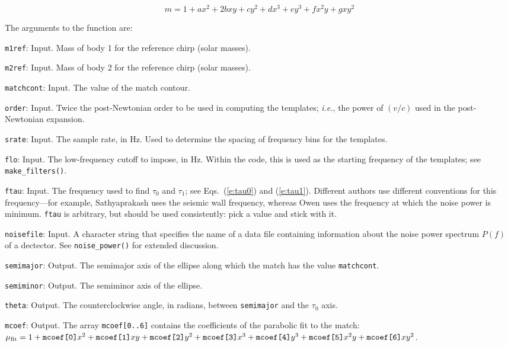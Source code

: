 \begin{equation}
m = 1 + a x^2 + 2b xy + c y^2 + dx^3 + e y^3 + fx^2y + g xy^2
\end{equation}

The arguments to the function are:

\begin{description}
\item{\tt{m1ref}}: Input.  Mass of body 1 for the reference chirp
(solar masses).
\item{\tt{m2ref}}: Input.  Mass of body 2 for the reference chirp
(solar masses).
\item{\tt{matchcont}}: Input.  The value of the match contour.
\item{\tt{order}}: Input.  Twice the post-Newtonian order to be
used in computing the templates; {\it i.e.}, the power of $(v/c)$
used in the post-Newtonian expansion.
\item{\tt{srate}}: Input.  The sample rate, in Hz.  Used to
determine the spacing of frequency bins for the templates.
\item{\tt{flo}}: Input. The low-frequency cutoff to impose, in
Hz. Within the code, this is used as the starting frequency of
the templates; see {\tt make\_filters()}.
\item{\tt{ftau}}: Input. The frequency used to find $\tau_0$
and $\tau_1$; see Eqs.\ (\ref{e:tau0}) and (\ref{e:tau1}).
Different authors use different conventions for this
frequency---for example, Sathyaprakash uses the seismic wall
frequency, whereas Owen uses the frequency at which the noise
power is minimum.  {\tt ftau} is arbitrary, but should be used
consistently: pick a value and stick with it.
\item{\tt{noisefile}}: Input.  A character string that specifies
the name of a data file containing information about the noise
power spectrum $P(f)$ of a dectector.  See {\tt noise\_power()}
for extended discussion.
\item{\tt{semimajor}}: Output.  The semimajor axis of the ellipse
along which the match has the value {\tt matchcont}.
\item{\tt{semiminor}}: Output.  The semiminor axis of the ellipse.
\item{\tt{theta}}: Output.  The counterclockwise angle, in radians,
between {\tt semimajor} and the $\tau_0$ axis.
\item{\tt{mcoef}}: Output.  The array {\tt mcoef[0..6]} contains the
coefficients of the parabolic fit to the match:
$\mu_{\rm fit} = 1 + {\hbox{\tt mcoef[0]}} x^2 + {\hbox{\tt mcoef[1]}} xy +
{\hbox{\tt mcoef[2]}} y^2 + {\hbox{\tt mcoef[3]}} x^3 +
{\hbox{\tt mcoef[4]}} y^3 + {\hbox{\tt mcoef[5]}} x^2y +
{\hbox{\tt mcoef[6]}} xy^2$.
\end{description}

